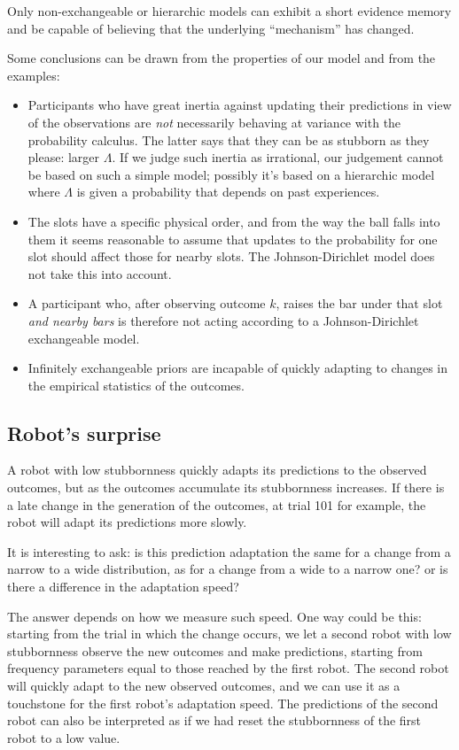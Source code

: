 \documentclass[\ifafour a4paper,12pt,\else a5paper,10pt,\fi%
onecolumn,oneside,article,%
british%
]{memoir}
\theoremstyle{remark}
\theoremstyle{innote}
\renewcommand*{\|}{\mathpunct{|}}
\newcommand*{\yN}{\varLambda}
\begin{document}
Only non-exchangeable or hierarchic models can exhibit a short evidence
memory and be capable of believing that the underlying \enquote{mechanism}
has changed.


Some conclusions can be drawn from the properties of our model and from the
examples:
\begin{itemize}[para]
\item Participants who have great inertia against updating their
  predictions in view of the observations are \emph{not} necessarily
  behaving at variance with the probability calculus. The latter says that
  they can be as stubborn as they please: larger $\yN$. If we judge such
  inertia as irrational, our judgement cannot be based on such a simple
  model; possibly it's based on a hierarchic model where $\yN$ is given a
  probability that depends on past experiences.

\item The slots have a specific physical order, and from the way the ball
  falls into them it seems reasonable to assume that updates to the
  probability for one slot should affect those for nearby slots. The
  Johnson-Dirichlet model does not take this into account. 

\item A participant who, after observing outcome $k$, raises the bar under
  that slot \emph{and nearby bars} is therefore not acting according to a
  Johnson-Dirichlet exchangeable model.
\item Infinitely exchangeable priors are incapable of quickly adapting to
  changes in the empirical statistics of the outcomes.
\end{itemize}


\subsection{Robot's surprise}
\label{sec:examples_robot_surprise}

A robot with low stubbornness quickly adapts its predictions to the
observed outcomes, but as the outcomes accumulate its stubbornness
increases. If there is a late change in the generation of the outcomes, at
trial 101 for example, the robot will adapt its predictions more slowly.

It is interesting to ask: is this prediction adaptation the same for a
change from a narrow to a wide distribution, as for a change from a wide to
a narrow one? or is there a difference in the adaptation speed?

The answer depends on how we measure such speed. One way could be this:
starting from the trial in which the change occurs, we let a second robot
with low stubbornness observe the new outcomes and make predictions,
starting from frequency parameters equal to those reached by the first
robot. The second robot will quickly adapt to the new observed outcomes,
and we can use it as a touchstone for the first robot's adaptation speed.
The predictions of the second robot can also be interpreted as if we had
reset the stubbornness of the first robot to a low value.
\end{document}
